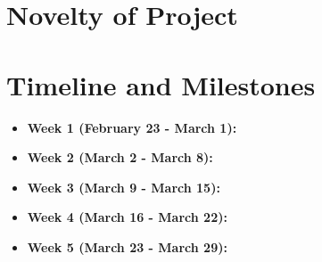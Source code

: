 \section{Novelty of Project}


\section{Timeline and Milestones}

\begin{itemize}
    \item \textbf{Week 1 (February 23 - March 1):}
    \item \textbf{Week 2 (March 2 - March 8):}
    \item \textbf{Week 3 (March 9 - March 15):}
    \item \textbf{Week 4 (March 16 - March 22):}
    \item \textbf{Week 5 (March 23 - March 29):}
\end{itemize}